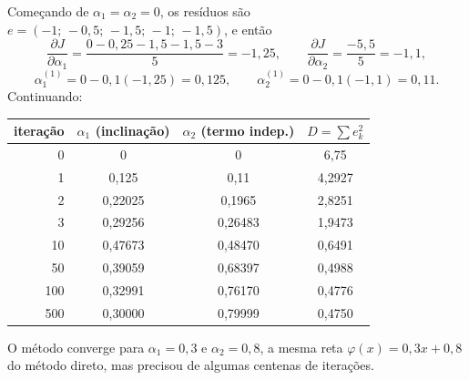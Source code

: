 \begin{exemplo}[{: as primeiras iterações, com $\eta=0{,}1$ e os 5 pontos do exemplo anterior}]
Começando de $\alpha_1=\alpha_2=0$, os resíduos são $e=(-1;\,-0{,}5;\,-1{,}5;\,-1;\,-1{,}5)$, e então
\[
\frac{\partial J}{\partial\alpha_1}=\frac{0-0{,}25-1{,}5-1{,}5-3}{5}=-1{,}25,\qquad
\frac{\partial J}{\partial\alpha_2}=\frac{-5{,}5}{5}=-1{,}1,
\]
\[
\alpha_1^{(1)}=0-0{,}1(-1{,}25)=0{,}125,\qquad \alpha_2^{(1)}=0-0{,}1(-1{,}1)=0{,}11 .
\]
Continuando:

\begin{center}
\begin{tabular}{rccc}
\toprule
iteração & $\alpha_1$ (inclinação) & $\alpha_2$ (termo indep.) & $D=\sum e_k^2$\\
\midrule
0 & 0 & 0 & 6,75\\
1 & 0,125 & 0,11 & 4,2927\\
2 & 0,22025 & 0,1965 & 2,8251\\
3 & 0,29256 & 0,26483 & 1,9473\\
10 & 0,47673 & 0,48470 & 0,6491\\
50 & 0,39059 & 0,68397 & 0,4988\\
100 & 0,32991 & 0,76170 & 0,4776\\
500 & 0,30000 & 0,79999 & 0,4750\\
\bottomrule
\end{tabular}
\end{center}

O método converge para $\alpha_1=0{,}3$ e $\alpha_2=0{,}8$, a mesma reta $\varphi(x)=0{,}3x+0{,}8$ do método direto,
mas precisou de algumas centenas de iterações.
\end{exemplo}

